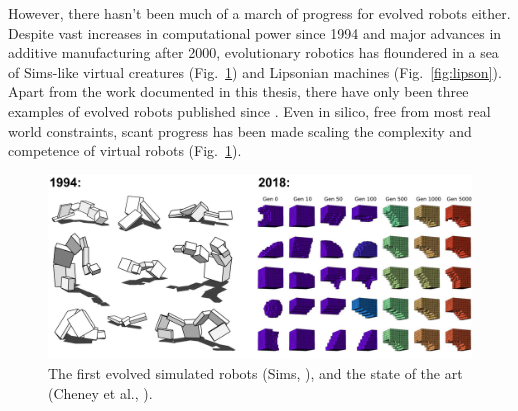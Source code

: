 However, there hasn't been much of a march of progress for evolved robots either.
Despite vast increases in computational power since 1994
and major advances in additive manufacturing after 2000,
evolutionary robotics has floundered in a sea of Sims-like virtual creatures (Fig.~\ref{fig:sims}) and Lipsonian machines (Fig.~\ref{fig:lipson}).
Apart from the work documented in this thesis,
there have only been three examples  \cite{hiller2012automatic,brodbeck2015morphological,cellucci20171d} of evolved robots published since \citet{lipson2000automatic}.
Even in silico,
free from most real world constraints,
scant progress has been made scaling the complexity and competence
of virtual robots \cite{cheney2016difficulty} (Fig.~\ref{fig:sims}).


\begin{figure}
\centering
\includegraphics[width=\linewidth]{fig/virtualevorobo.pdf}
\caption{\label{fig:sims}%
The first evolved simulated robots (Sims, \cite{sims1994evolving}), and the state of the art (Cheney et al., \cite{cheney2018scalable}).
}
\end{figure}





